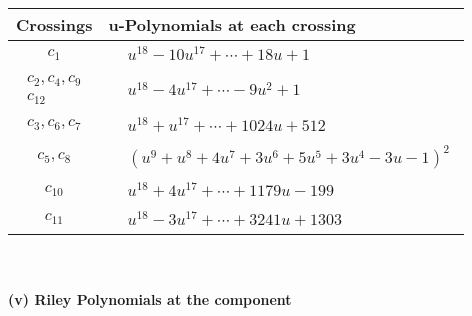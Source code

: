 \documentclass[1p]{elsarticle_modified}
\theoremstyle{definition}
\begin{document}
\begin{tabular}{m{50pt}|m{274pt}}
Crossings & \hspace{64pt}u-Polynomials at each crossing \\
\hline $$\begin{aligned}c_{1}\end{aligned}$$&$\begin{aligned}
&u^{18}-10 u^{17}+\cdots+18 u+1
\end{aligned}$\\
\hline $$\begin{aligned}c_{2},c_{4},c_{9}\\c_{12}\end{aligned}$$&$\begin{aligned}
&u^{18}-4 u^{17}+\cdots-9 u^2+1
\end{aligned}$\\
\hline $$\begin{aligned}c_{3},c_{6},c_{7}\end{aligned}$$&$\begin{aligned}
&u^{18}+u^{17}+\cdots+1024 u+512
\end{aligned}$\\
\hline $$\begin{aligned}c_{5},c_{8}\end{aligned}$$&$\begin{aligned}
&(u^9+u^8+4 u^7+3 u^6+5 u^5+3 u^4-3 u-1)^2
\end{aligned}$\\
\hline $$\begin{aligned}c_{10}\end{aligned}$$&$\begin{aligned}
&u^{18}+4 u^{17}+\cdots+1179 u-199
\end{aligned}$\\
\hline $$\begin{aligned}c_{11}\end{aligned}$$&$\begin{aligned}
&u^{18}-3 u^{17}+\cdots+3241 u+1303
\end{aligned}$\\
\hline
\end{tabular}\\~\\
\newpage\renewcommand{\arraystretch}{1}
\flushleft \textbf{(v) Riley Polynomials at the component}\newline \\
\end{document}
